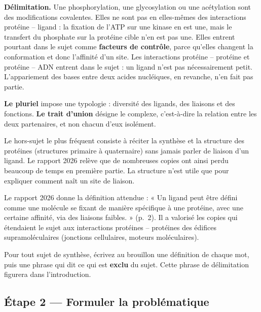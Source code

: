 \documentclass[11pt,a4paper]{article}
\begin{document}
\textbf{Délimitation.} Une phosphorylation, une glycosylation ou une acétylation sont des modifications covalentes. Elles ne sont pas en elles-mêmes des interactions protéine -- ligand : la fixation de l'ATP sur une kinase en est une, mais le transfert du phosphate sur la protéine cible n'en est pas une. Elles entrent pourtant dans le sujet comme \textbf{facteurs de contrôle}, parce qu'elles changent la conformation et donc l'affinité d'un site. Les interactions protéine -- protéine et protéine -- ADN entrent dans le sujet : un ligand n'est pas nécessairement petit. L'appariement des bases entre deux acides nucléiques, en revanche, n'en fait pas partie.

\textbf{Le pluriel} impose une typologie : diversité des ligands, des liaisons et des fonctions. \textbf{Le trait d'union} désigne le complexe, c'est-à-dire la relation entre les deux partenaires, et non chacun d'eux isolément.

\begin{piege}

Le hors-sujet le plus fréquent consiste à réciter la synthèse et la structure des protéines (structures primaire à quaternaire) sans jamais parler de liaison d'un ligand. Le rapport 2026 relève que de nombreuses copies ont ainsi perdu beaucoup de temps en première partie. La structure n'est utile que pour expliquer comment naît un site de liaison.

\end{piege}

\begin{jury}

Le rapport 2026 donne la définition attendue : « Un ligand peut être défini comme une molécule se fixant de manière spécifique à une protéine, avec une certaine affinité, via des liaisons faibles. » (p.~2). Il a valorisé les copies qui étendaient le sujet aux interactions protéines -- protéines des édifices supramoléculaires (jonctions cellulaires, moteurs moléculaires).

\end{jury}

\begin{methode}

Pour tout sujet de synthèse, écrivez au brouillon une définition de chaque mot, puis une phrase qui dit ce qui est \textbf{exclu} du sujet. Cette phrase de délimitation figurera dans l'introduction.

\end{methode}

\hypertarget{uxe9tape-2-formuler-la-probluxe9matique}{%
\subsection{Étape 2 --- Formuler la problématique}\label{uxe9tape-2-formuler-la-probluxe9matique}}
\end{document}
